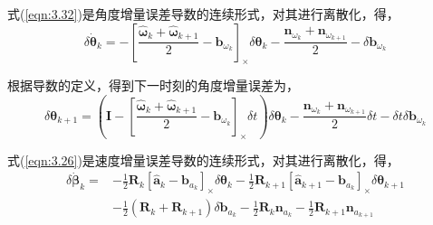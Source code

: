 式(\ref{eqn:3.32})是角度增量误差导数的连续形式，对其进行离散化，得，
\begin{equation}
\label{eqn:3.42}
\delta \dot{\bm{\theta}}_{k}=-\left[\frac{\hat{\bm{\omega}}_{k}+\hat{\bm{\omega}}_{k+1}}{2}-\mathbf{b}_{\omega_{k}}\right]_\times \delta \bm{\theta}_{k}
-\frac{\mathbf{n}_{\omega_{k}}+\mathbf{n}_{\omega_{k+1}}}{2}-\delta \mathbf{b}_{\omega_{k}}
\end{equation}

根据导数的定义，得到下一时刻的角度增量误差为，
\begin{equation}
\label{eqn:3.43}
\delta \bm{\theta}_{k+1}=\left(\mathbf{I}-\left[\frac{\hat{\bm{\omega}}_{k}+\hat{\bm{\omega}}_{k+1}}{2}-\mathbf{b}_{\omega_{k}}\right]_\times \delta t\right) \delta \bm{\theta}_{k}
- \frac{\mathbf{n}_{\omega_{k}} + \mathbf{n}_{\omega_{k+1}}}{2} \delta t
- \delta t \delta \mathbf{b}_{\omega_{k}}
\end{equation}

式(\ref{eqn:3.26})是速度增量误差导数的连续形式，对其进行离散化，得，
\begin{equation}
\label{eqn:3.44}
\begin{aligned}
\delta \dot{\bm{\beta}}_{k}= & -\frac{1}{2} \mathbf{R}_{k} \left[\hat{\mathbf{a}}_{k}- \mathbf{b}_{a_{k}}\right]_\times \delta \bm{\theta}_{k} 
- \frac{1}{2} \mathbf{R}_{k+1}\left[\hat{\mathbf{a}}_{k+1} - \mathbf{b}_{a_{k}}\right]_\times \delta \bm{\theta}_{k+1} \\
&- \frac{1}{2}\left(\mathbf{R}_{k} + \mathbf{R}_{k+1}\right) \delta \mathbf{b}_{a_{k}}
- \frac{1}{2} \mathbf{R}_{k} \mathbf{n}_{a_{k}}
-\frac{1}{2} \mathbf{R}_{k+1} \mathbf{n}_{a_{k+1}}
\end{aligned}
\end{equation}

